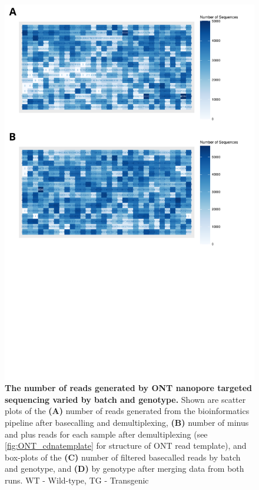 \begin{figure}[!htp]
	\centering
	\includegraphics[page=4,trim={0 0 0 0},clip,scale = 0.55]{Figures/ONTTargetedTranscriptome.pdf}
	\captionsetup{width=0.95\textwidth}
	\caption[ONT sequencing metrics from targeted profiling of rTg4510 mice]%
	{\textbf{The number of reads generated by ONT nanopore targeted sequencing varied by batch and genotype.} Shown are scatter plots of the \textbf{(A)} number of reads generated from the bioinformatics pipeline after basecalling and demultiplexing, \textbf{(B)} number of minus and plus reads for each sample after demultiplexing (see \cref{fig:ONT_cdnatemplate} for structure of ONT read template), and box-plots of the \textbf{(C)} number of filtered basecalled reads by batch and genotype, and \textbf{(D)} by genotype after merging data from both runs. WT - Wild-type, TG - Transgenic }
	\label{fig:ONT_targeted_run_output}
\end{figure}


